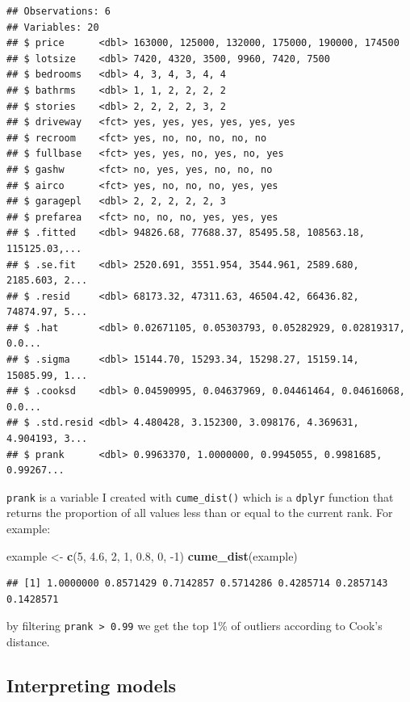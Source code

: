 \documentclass[]{gitbook}
\newenvironment{Shaded}{\begin{snugshade}}{\end{snugshade}}
\newcommand{\DecValTok}[1]{\textcolor[rgb]{0.00,0.00,0.81}{#1}}
\newcommand{\FloatTok}[1]{\textcolor[rgb]{0.00,0.00,0.81}{#1}}
\newcommand{\KeywordTok}[1]{\textcolor[rgb]{0.13,0.29,0.53}{\textbf{#1}}}
\newcommand{\NormalTok}[1]{#1}
\newcommand{\StringTok}[1]{\textcolor[rgb]{0.31,0.60,0.02}{#1}}
\begin{document}
\begin{verbatim}
## Observations: 6
## Variables: 20
## $ price      <dbl> 163000, 125000, 132000, 175000, 190000, 174500
## $ lotsize    <dbl> 7420, 4320, 3500, 9960, 7420, 7500
## $ bedrooms   <dbl> 4, 3, 4, 3, 4, 4
## $ bathrms    <dbl> 1, 1, 2, 2, 2, 2
## $ stories    <dbl> 2, 2, 2, 2, 3, 2
## $ driveway   <fct> yes, yes, yes, yes, yes, yes
## $ recroom    <fct> yes, no, no, no, no, no
## $ fullbase   <fct> yes, yes, no, yes, no, yes
## $ gashw      <fct> no, yes, yes, no, no, no
## $ airco      <fct> yes, no, no, no, yes, yes
## $ garagepl   <dbl> 2, 2, 2, 2, 2, 3
## $ prefarea   <fct> no, no, no, yes, yes, yes
## $ .fitted    <dbl> 94826.68, 77688.37, 85495.58, 108563.18, 115125.03,...
## $ .se.fit    <dbl> 2520.691, 3551.954, 3544.961, 2589.680, 2185.603, 2...
## $ .resid     <dbl> 68173.32, 47311.63, 46504.42, 66436.82, 74874.97, 5...
## $ .hat       <dbl> 0.02671105, 0.05303793, 0.05282929, 0.02819317, 0.0...
## $ .sigma     <dbl> 15144.70, 15293.34, 15298.27, 15159.14, 15085.99, 1...
## $ .cooksd    <dbl> 0.04590995, 0.04637969, 0.04461464, 0.04616068, 0.0...
## $ .std.resid <dbl> 4.480428, 3.152300, 3.098176, 4.369631, 4.904193, 3...
## $ prank      <dbl> 0.9963370, 1.0000000, 0.9945055, 0.9981685, 0.99267...
\end{verbatim}

\texttt{prank} is a variable I created with \texttt{cume\_dist()} which is a \texttt{dplyr} function that returns the
proportion of all values less than or equal to the current rank. For example:

\begin{Shaded}
\begin{Highlighting}[]
\NormalTok{example <-}\StringTok{ }\KeywordTok{c}\NormalTok{(}\DecValTok{5}\NormalTok{, }\FloatTok{4.6}\NormalTok{, }\DecValTok{2}\NormalTok{, }\DecValTok{1}\NormalTok{, }\FloatTok{0.8}\NormalTok{, }\DecValTok{0}\NormalTok{, }\DecValTok{-1}\NormalTok{)}
\KeywordTok{cume_dist}\NormalTok{(example)}
\end{Highlighting}
\end{Shaded}

\begin{verbatim}
## [1] 1.0000000 0.8571429 0.7142857 0.5714286 0.4285714 0.2857143 0.1428571
\end{verbatim}

by filtering \texttt{prank\ \textgreater{}\ 0.99} we get the top 1\% of outliers according to Cook's distance.

\hypertarget{interpreting-models}{%
\subsection{Interpreting models}\label{interpreting-models}}
\end{document}
